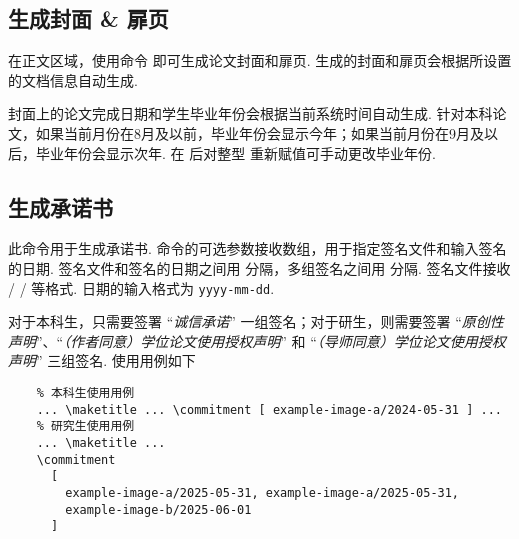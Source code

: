 \subsection{生成封面 \& 扉页}

在正文区域，使用命令  即可生成论文封面和扉页. 生成的封面和扉页会根据所设置的文档信息自动生成.

封面上的论文完成日期和学生毕业年份会根据当前系统时间自动生成.
针对本科论文，如果当前月份在8月及以前，毕业年份会显示今年；如果当前月份在9月及以后，毕业年份会显示次年. 在  后对整型  重新赋值可手动更改毕业年份.

\begin{syntax}
      
\end{syntax}

\subsection{生成承诺书}

\begin{function}{\commitment}
  \begin{syntax}
     
  \end{syntax}

  此命令用于生成承诺书. 命令的可选参数接收数组，用于指定签名文件和输入签名的日期. 签名文件和签名的日期之间用 \cmd{/} 分隔，多组签名之间用 \cmd{,} 分隔. 签名文件接收  /  /  等格式. 日期的输入格式为 \texttt{yyyy-mm-dd}.
\end{function}

对于本科生，只需要签署 ``\emph*{诚信承诺}'' 一组签名；对于研生，则需要签署 ``\emph*{原创性声明}''、``\emph*{（作者同意）学位论文使用授权声明}'' 和 ``\emph*{（导师同意）学位论文使用授权声明}'' 三组签名. 使用用例如下

\begin{framed}
  \begin{verbatim}
    % 本科生使用用例
    ... \maketitle ... \commitment [ example-image-a/2024-05-31 ] ...
    % 研究生使用用例
    ... \maketitle ...
    \commitment
      [
        example-image-a/2025-05-31, example-image-a/2025-05-31,
        example-image-b/2025-06-01
      ]
  \end{verbatim}
\end{framed}

